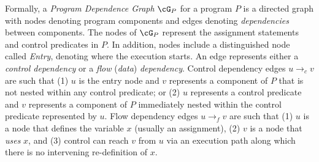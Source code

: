 \documentclass[prodmode,acmtocl]{acmsmall}
\def\prog{\ensuremath{P}\xspace}
\newcommand{\lra}{\longrightarrow}
\newcommand{\0}{\mbox{\bf 0}}
\begin{document}
Formally, a \emph{Program Dependence Graph} \cite{GL91ieee}
$\cG_\prog$ for a program $\prog$ is a directed graph with nodes
denoting program components and edges denoting \emph{dependencies}
between components.  The nodes of $\cG_\prog$ represent the assignment
statements and control predicates in $\prog$.  In addition, nodes
include a distinguished node called \emph{Entry}, denoting where the
execution starts.  An edge represents either a \emph{control
  dependency} or a \emph{flow} (\emph{data}) {\em dependency}.
Control dependency edges $u\lra_c v$ are such that (1) $u$ is the
entry node and $v$ represents a component of $\prog$ that is not
nested within any control predicate; or (2) $u$ represents a control
predicate and $v$ represents a component of $\prog$ immediately nested
within the control predicate represented by $u$.  Flow dependency
edges $u\lra_f v$ are such that (1) $u$ is a node that defines the
variable $x$ (usually an assignment), (2) $v$ is a node that
\emph{uses} $x$, and (3) control can reach $v$ from $u$ via an
execution path along which there is no intervening re-definition of
$x$.
\end{document}
